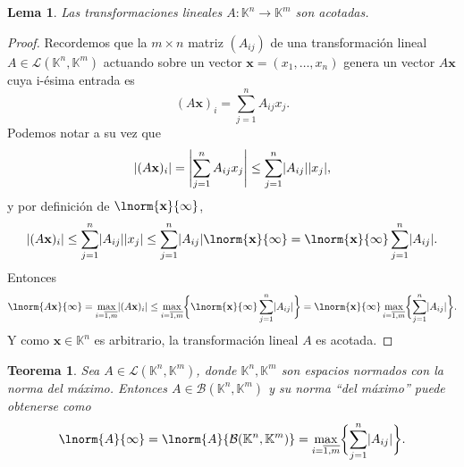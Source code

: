 \documentclass[11pt]{article}
\renewcommand{\vec}{\mathbf} %
\DeclarePairedDelimiter{\abs}{\lvert }{\rvert}
\newtheorem{theorem}{Teorema} %
\newtheorem{lemma}{Lema}
\begin{document}
\begin{Exercise}\end{Exercise}
\begin{Answer}
	\begin{lemma}
		Las transformaciones lineales $A : \mathbb K^n \to \mathbb K^m$ son acotadas.
	\end{lemma}
	\begin{proof}
		Recordemos que la $m \times n$ matriz $(A_{ij})$ de una transformación lineal $A \in \mathcal L(\mathbb K^n, \mathbb K^m)$ actuando sobre un vector $\vec x = (x_1, \dotsc, x_n)$ genera un vector $A\vec x$ cuya i-ésima entrada es
		\begin{equation}
			(A\vec x)_i = \sum_{j = 1}^n A_{ij} x_j.
		\end{equation}
		Podemos notar a su vez que
			\begin{equation}
			\abs{(A\vec x)_i} = \abs[\Bigg]{\sum_{j = 1}^n A_{ij} x_j} \le \sum_{j=1}^n \abs{A_{ij}}\abs{x_j},
		\end{equation}
		y por definición de $\lnorm{\vec x}{\infty}$,
		\begin{equation}
			\abs{(A\vec x)_i}
			\le \sum_{j=1}^n \abs{A_{ij}}\abs{x_j}
			\le \sum_{j=1}^n \abs{A_{ij}}\lnorm{\vec x}{\infty}
			= \lnorm{\vec x}{\infty} \sum_{j=1}^n \abs{A_{ij}}.
		\end{equation}
		Entonces
		\begin{equation}\label{eq: susp}
			\lnorm{A\vec x}{\infty} = \max_{i = \overline{1,m}} \abs{(A\vec x)_i}
			\le  \max_{i = \overline{1,m}} \biggl\{ \lnorm{\vec x}{\infty} \sum_{j=1}^n \abs{A_{ij}}\biggr\}
			=   \lnorm{\vec x}{\infty}\max_{i = \overline{1,m}} \biggl\{ \sum_{j=1}^n \abs{A_{ij}}\biggr\}.
		\end{equation}
	Y como $\vec x \in \mathbb K^n$ es arbitrario, la transformación lineal $A$ es acotada.
	\end{proof}
	
	\begin{theorem}
		Sea $A \in \mathcal L(\mathbb K^n, \mathbb K^m)$, donde $\mathbb K^n, \mathbb K^m$ son espacios normados con la norma del máximo. Entonces $A \in \mathcal B(\mathbb K^n, \mathbb K^m)$ y su norma ``\emph{del máximo}'' puede obtenerse como
		\begin{equation}
			\lnorm{A}{\infty} = \lnorm{A}{{\mathcal B(\mathbb K^n, \mathbb K^m)}} = \max_{i = \overline{1,m}} \biggl\{ \sum_{j=1}^n \abs{A_{ij}}\biggr\}.
		\end{equation}
	\end{theorem}
	

\end{Answer}
\end{document}
